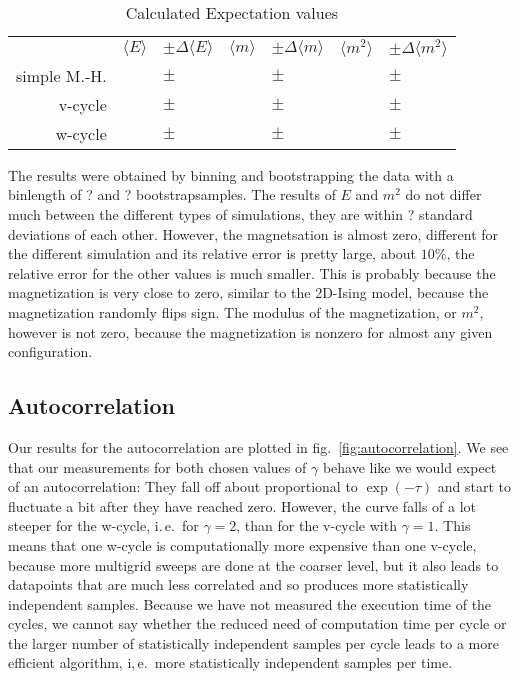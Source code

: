 \documentclass{scrartcl}
\begin{document}
\begin{table}[htbp]
	\begin{center}
	\begin{tabular}{r|rl|rl|rl}
& $\langle E \rangle$ & $\pm\Delta \langle E \rangle$ & $\langle m \rangle$ & $\pm\Delta\langle m \rangle$ & $\langle m^2 \rangle$ & $\pm\Delta \langle m^2 \rangle$ \\
simple M.-H. &                     &             $\pm$             &                     &            $\pm$             &                       &              $\pm$              \\
v-cycle &                     &             $\pm$             &                     &            $\pm$             &                       &              $\pm$              \\
w-cycle &                     &             $\pm$             &                     &            $\pm$             &                       &              $\pm$
	\end{tabular}
	\end{center}
	\caption{Calculated Expectation values}
	\label{tab:results}
\end{table}

The results were obtained by binning and bootstrapping the data with a binlength of ? and ? bootstrapsamples. The results of $E$ and $m^2$ do not differ much between the different types of simulations, they are within ? standard deviations of each other. However, the magnetsation is almost zero, different for the different simulation and its relative error is pretty large, about $10\%$, the relative error for the other values is much smaller. This is probably because the magnetization is very close to zero, similar to the 2D-Ising model, because the magnetization randomly flips sign. The modulus of the magnetization, or $m^2$, however is not zero, because the magnetization is nonzero for almost any given configuration.

\subsection{Autocorrelation}

Our results for the autocorrelation are plotted in fig.~\ref{fig:autocorrelation}. We see that our measurements for both chosen values of $\gamma$ behave like we would expect of an autocorrelation: They fall off about proportional to $\exp(-\tau)$ and start to fluctuate a bit after they have reached zero. However, the curve falls of a lot steeper for the w-cycle, i.\,e.\, for $\gamma=2$, than for the v-cycle with $\gamma=1$. This means that one w-cycle is computationally more expensive than one v-cycle, because more multigrid sweeps are done at the coarser level, but it also leads to datapoints that are much less correlated and so produces more statistically independent samples. Because we have not measured the execution time of the cycles, we cannot say whether the reduced need of computation time per cycle or the larger number of statistically independent samples per cycle leads to a more efficient algorithm, i,\,e.\, more statistically independent samples per time.
 
\end{document}
